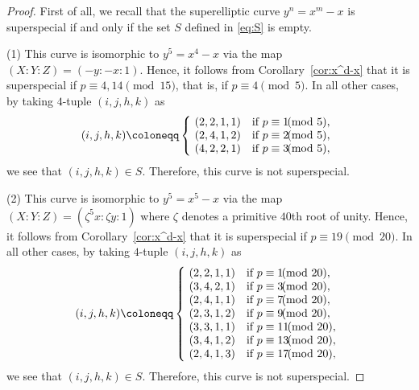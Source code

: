 \documentclass{article}
\theoremstyle{definition}
\begin{document}
\begin{proof}
First of all, we recall that the superelliptic curve $y^n = x^m-x$ is superspecial if and only if the set $S$ defined in \eqref{eq:S} is empty.\par
\hspace{5.8mm}(1) This curve is isomorphic to $y^5 = x^4-x$ via the map $(X:Y:Z) = (-y:-x:1)$.
Hence, it follows from Corollary~\ref{cor:x^d-x} that it is superspecial if $p \equiv 4,14 \pmod{15}$, that is, if $p \equiv 4 \pmod{5}$.
In all other cases, by taking $4$-tuple $(i,j,h,k)$ as\vspace{-0.9mm}
\[
    (i,j,h,k) \coloneqq \left\{
        \begin{array}{ll}
            \!(2,2,1,1) & \text{if } p \equiv 1 \hspace{-2mm}\pmod{5},\\
            \!(2,4,1,2) & \text{if } p \equiv 2 \hspace{-2mm}\pmod{5},\\
            \!(4,2,2,1) & \text{if } p \equiv 3 \hspace{-2mm}\pmod{5},
        \end{array}
    \right.\vspace{0.2mm}
\]
we see that $(i,j,h,k) \in S$.
Therefore, this curve is not superspecial.\par
\hspace{5.8mm}(2) This curve is isomorphic to $y^5 = x^5-x$ via the map $(X:Y:Z) =(\zeta^5x:\zeta y:1)$ where $\zeta$ denotes a primitive $40$th root of unity.
Hence, it follows from Corollary~\ref{cor:x^d-x} that it is superspecial if $p \equiv 19 \pmod{20}$.
In all other cases, by taking $4$-tuple $(i,j,h,k)$ as\vspace{0.5mm}
\[
    (i,j,h,k) \coloneqq \left\{
        \begin{array}{ll}
            \!(2,2,1,1) & \text{if } p \equiv 1 \hspace{-2mm}\pmod{20},\\
            \!(3,4,2,1) & \text{if } p \equiv 3 \hspace{-2mm}\pmod{20},\\
            \!(2,4,1,1) & \text{if } p \equiv 7 \hspace{-2mm}\pmod{20},\\
            \!(2,3,1,2) & \text{if } p \equiv 9 \hspace{-2mm}\pmod{20},\\
            \!(3,3,1,1) & \text{if } p \equiv 11 \hspace{-2mm}\pmod{20},\\
            \!(3,4,1,2) & \text{if } p \equiv 13 \hspace{-2mm}\pmod{20},\\
            \!(2,4,1,3) & \text{if } p \equiv 17 \hspace{-2mm}\pmod{20},
        \end{array}
    \right.\vspace{0.2mm}
\]
we see that $(i,j,h,k) \in S$.
Therefore, this curve is not superspecial.


\end{proof}
\end{document}
